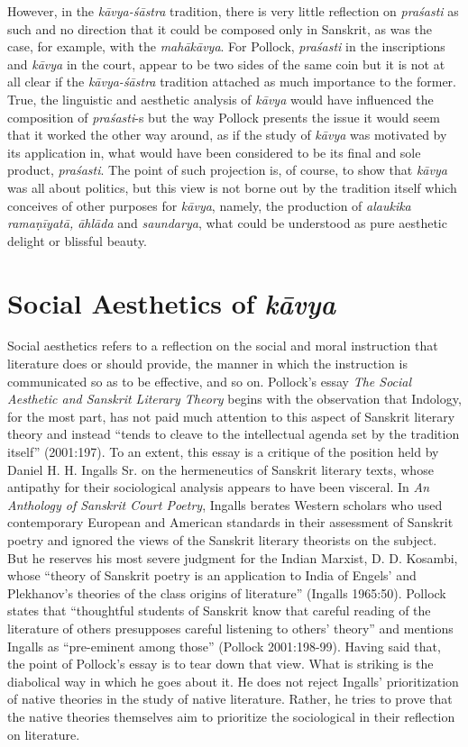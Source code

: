 However, in the {\sl kāvya-śāstra} tradition, there is very little reflection on {\sl praśasti} as such and no direction that it could be composed only in Sanskrit, as was the case, for example, with the {\sl mahākāvya}. For Pollock, {\sl praśasti} in the inscriptions and {\sl kāvya} in the court, appear to be two sides of the same coin but it is not at all clear if the {\sl kāvya-śāstra} tradition attached as much importance to the former. True, the linguistic and aesthetic analysis of {\sl kāvya} would have influenced the composition of {\sl praśasti}-s but the way Pollock presents the issue it would seem that it worked the other way around, as if the study of {\sl kāvya} was motivated by its application in, what would have been considered to be its final and sole product, {\sl praśasti}. The point of such projection is, of course, to show that {\sl kāvya} was all about politics, but this view is not borne out by the tradition itself which conceives of other purposes for {\sl kāvya}, namely, the production of {\sl alaukika ramaṇīyatā, āhlāda} and {\sl saundarya}, what could be understood as pure aesthetic delight or blissful beauty.\\[-20pt]  

\section*{Social Aesthetics of {\sl\bfseries kāvya}}

Social aesthetics refers to a reflection on the social and moral instruction that literature does or should provide, the manner in which the instruction is communicated so as to be effective, and so on. Pollock's essay {\sl The Social Aesthetic and Sanskrit Literary Theory} begins with the observation that Indology, for the most part, has not paid much attention to this aspect of Sanskrit literary theory and instead ``tends to cleave to the intellectual agenda set by the tradition itself'' (2001:197). To an extent, this essay is a critique of the position held by Daniel H. H. Ingalls Sr. on the hermeneutics of Sanskrit literary texts, whose antipathy for their sociological analysis appears to have been visceral. In {\sl An Anthology of Sanskrit Court Poetry}, Ingalls berates Western scholars who used contemporary European and American standards in their assessment of Sanskrit poetry and ignored the views of the Sanskrit literary theorists on the subject. But he reserves his most severe judgment for the Indian Marxist, D. D. Kosambi, whose ``theory of Sanskrit poetry is an application to India of Engels' and Plekhanov's theories of the class origins of literature'' (Ingalls 1965:50). Pollock states that ``thoughtful students of Sanskrit know that careful reading of the literature of others presupposes careful listening to others' theory'' and mentions Ingalls as ``pre-eminent among those'' (Pollock 2001:198-99). Having said that, the point of Pollock's essay is to tear down that view. What is striking is the diabolical way in which he goes about it. He does not reject Ingalls' prioritization of native theories in the study of native literature. Rather, he tries to prove that the native theories themselves aim to prioritize the sociological in their reflection on literature.

